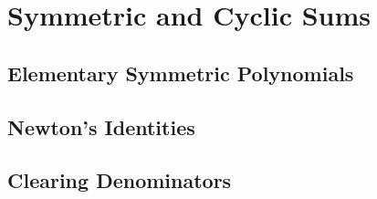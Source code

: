 \documentclass[../../../main.tex]{subfiles}
\begin{document}
\section{Symmetric and Cyclic Sums}

\subsection{Elementary Symmetric Polynomials}

\subsection{Newton's Identities}

\subsection{Clearing Denominators}
\end{document}
